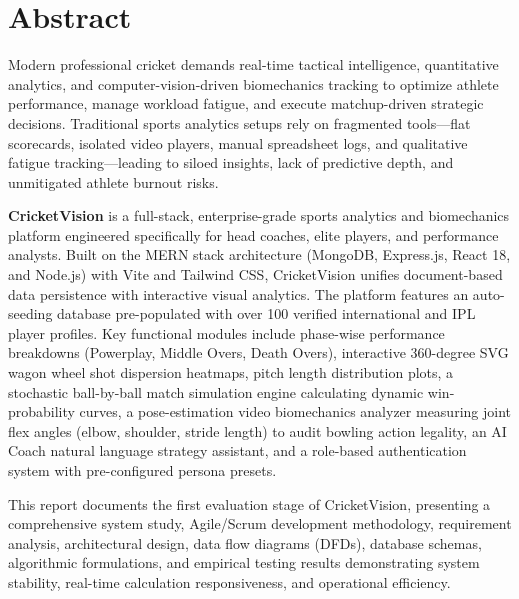 \documentclass[12pt,a4paper]{report}
\begin{document}


\tableofcontents

\clearpage

\listoffigures

\clearpage

\listoftables

\clearpage

\chapter*{Abstract}
\centering
\begin{minipage}{0.9\textwidth}
Modern professional cricket demands real-time tactical intelligence, quantitative analytics, and computer-vision-driven biomechanics tracking to optimize athlete performance, manage workload fatigue, and execute matchup-driven strategic decisions. Traditional sports analytics setups rely on fragmented tools—flat scorecards, isolated video players, manual spreadsheet logs, and qualitative fatigue tracking—leading to siloed insights, lack of predictive depth, and unmitigated athlete burnout risks.

\textbf{CricketVision} is a full-stack, enterprise-grade sports analytics and biomechanics platform engineered specifically for head coaches, elite players, and performance analysts. Built on the MERN stack architecture (MongoDB, Express.js, React 18, and Node.js) with Vite and Tailwind CSS, CricketVision unifies document-based data persistence with interactive visual analytics. The platform features an auto-seeding database pre-populated with over 100 verified international and IPL player profiles. Key functional modules include phase-wise performance breakdowns (Powerplay, Middle Overs, Death Overs), interactive 360-degree SVG wagon wheel shot dispersion heatmaps, pitch length distribution plots, a stochastic ball-by-ball match simulation engine calculating dynamic win-probability curves, a pose-estimation video biomechanics analyzer measuring joint flex angles (elbow, shoulder, stride length) to audit bowling action legality, an AI Coach natural language strategy assistant, and a role-based authentication system with pre-configured persona presets.

This report documents the first evaluation stage of CricketVision, presenting a comprehensive system study, Agile/Scrum development methodology, requirement analysis, architectural design, data flow diagrams (DFDs), database schemas, algorithmic formulations, and empirical testing results demonstrating system stability, real-time calculation responsiveness, and operational efficiency.
\end{minipage}
\end{document}

